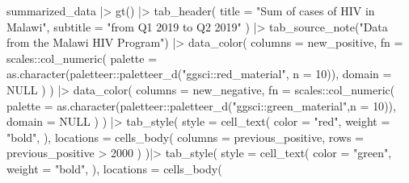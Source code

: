\documentclass[
]{article}
\newenvironment{Shaded}{\begin{snugshade}}{\end{snugshade}}
\newcommand{\AttributeTok}[1]{\textcolor[rgb]{0.77,0.63,0.00}{#1}}
\newcommand{\ConstantTok}[1]{\textcolor[rgb]{0.00,0.00,0.00}{#1}}
\newcommand{\DecValTok}[1]{\textcolor[rgb]{0.00,0.00,0.81}{#1}}
\newcommand{\FunctionTok}[1]{\textcolor[rgb]{0.00,0.00,0.00}{#1}}
\newcommand{\NormalTok}[1]{#1}
\newcommand{\SpecialCharTok}[1]{\textcolor[rgb]{0.00,0.00,0.00}{#1}}
\newcommand{\StringTok}[1]{\textcolor[rgb]{0.31,0.60,0.02}{#1}}
\begin{document}
\begin{Shaded}
\begin{Highlighting}[]
\NormalTok{summarized\_data }\SpecialCharTok{|\textgreater{}} 
  \FunctionTok{gt}\NormalTok{() }\SpecialCharTok{|\textgreater{}} 
  \FunctionTok{tab\_header}\NormalTok{(}
    \AttributeTok{title =} \StringTok{"Sum of cases of HIV in Malawi"}\NormalTok{,}
    \AttributeTok{subtitle =} \StringTok{"from Q1 2019 to Q2 2019"}
\NormalTok{  ) }\SpecialCharTok{|\textgreater{}} 
  \FunctionTok{tab\_source\_note}\NormalTok{(}\StringTok{"Data from the Malawi HIV Program"}\NormalTok{) }\SpecialCharTok{|\textgreater{}} 
  \FunctionTok{data\_color}\NormalTok{(}
    \AttributeTok{columns =}\NormalTok{ new\_positive,}
    \AttributeTok{fn =}\NormalTok{ scales}\SpecialCharTok{::}\FunctionTok{col\_numeric}\NormalTok{(}
      \AttributeTok{palette =} \FunctionTok{as.character}\NormalTok{(paletteer}\SpecialCharTok{::}\FunctionTok{paletteer\_d}\NormalTok{(}\StringTok{"ggsci::red\_material"}\NormalTok{, }\AttributeTok{n =} \DecValTok{10}\NormalTok{)),}
      \AttributeTok{domain =} \ConstantTok{NULL}
\NormalTok{    )}
\NormalTok{  ) }\SpecialCharTok{|\textgreater{}} 
  \FunctionTok{data\_color}\NormalTok{(}
    \AttributeTok{columns =}\NormalTok{ new\_negative,}
    \AttributeTok{fn =}\NormalTok{ scales}\SpecialCharTok{::}\FunctionTok{col\_numeric}\NormalTok{(}
      \AttributeTok{palette =} \FunctionTok{as.character}\NormalTok{(paletteer}\SpecialCharTok{::}\FunctionTok{paletteer\_d}\NormalTok{(}\StringTok{"ggsci::green\_material"}\NormalTok{,}\AttributeTok{n =} \DecValTok{10}\NormalTok{)),}
      \AttributeTok{domain =} \ConstantTok{NULL}
\NormalTok{    )}
\NormalTok{  ) }\SpecialCharTok{|\textgreater{}} 
  \FunctionTok{tab\_style}\NormalTok{(}
    \AttributeTok{style =} \FunctionTok{cell\_text}\NormalTok{(}
      \AttributeTok{color =} \StringTok{"red"}\NormalTok{,}
      \AttributeTok{weight =} \StringTok{"bold"}\NormalTok{,}
\NormalTok{    ),}
    \AttributeTok{locations =} \FunctionTok{cells\_body}\NormalTok{(}
      \AttributeTok{columns =}\NormalTok{ previous\_positive,}
      \AttributeTok{rows =}\NormalTok{ previous\_positive }\SpecialCharTok{\textgreater{}} \DecValTok{2000}
\NormalTok{    )}
\NormalTok{  )}\SpecialCharTok{|\textgreater{}} 
  \FunctionTok{tab\_style}\NormalTok{(}
    \AttributeTok{style =} \FunctionTok{cell\_text}\NormalTok{(}
      \AttributeTok{color =} \StringTok{"green"}\NormalTok{,}
      \AttributeTok{weight =} \StringTok{"bold"}\NormalTok{,}
\NormalTok{    ),}
    \AttributeTok{locations =} \FunctionTok{cells\_body}\NormalTok{(}

\end{Highlighting}
\end{Shaded}
\end{document}
